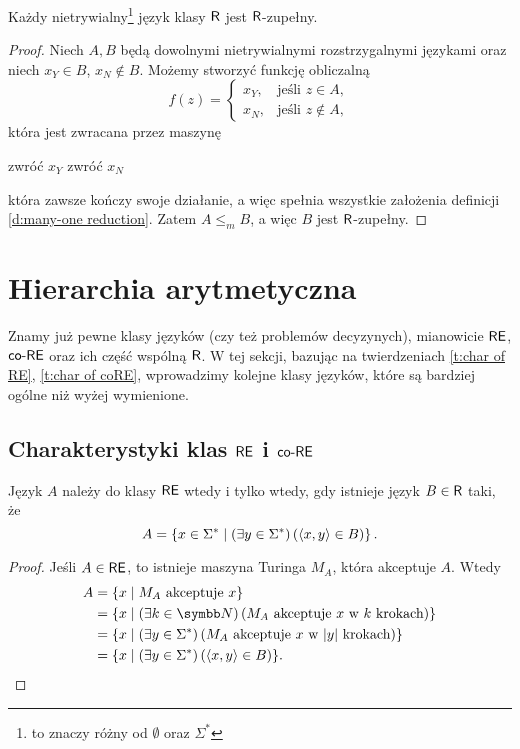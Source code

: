 \begin{theorem}\label{t:nontrivial R language is R-complete}
    Każdy nietrywialny\footnote{to znaczy różny od $\emptyset$ oraz $\Sigma^*$} język klasy $\textsf{R}$ jest $\textsf{R}$-zupełny.
\end{theorem}
\begin{proof}
    Niech $A, B$ będą dowolnymi nietrywialnymi rozstrzygalnymi językami oraz niech $x_Y \in B$, $x_N \notin B$. Możemy stworzyć funkcję obliczalną
    \[ f(z) =
        \begin{cases}
            x_Y, & \text{jeśli } z \in A, \\
            x_N, & \text{jeśli } z \notin A,
        \end{cases}
    \]
    która jest zwracana przez maszynę
    \begin{algorithmic}
            \State zwróć $x_Y$
        \Else
            \State zwróć $x_N$
        \EndIf
    \end{algorithmic}
    która zawsze kończy swoje działanie, a więc spełnia wszystkie założenia definicji \ref{d:many-one reduction}. Zatem $A \leq_m B$, a więc $B$ jest $\textsf{R}$-zupełny.
\end{proof}

\section{Hierarchia arytmetyczna}
Znamy już pewne klasy języków (czy też problemów decyzynych), mianowicie $\textsf{RE}$, $\textsf{co-RE}$ oraz ich część wspólną $\textsf{R}$. W tej sekcji, bazując na twierdzeniach \ref{t:char of RE}, \ref{t:char of coRE}, wprowadzimy kolejne klasy języków, które są bardziej ogólne niż wyżej wymienione.

\subsection{Charakterystyki klas $\textsf{RE}$ i $\textsf{co-RE}$}

\begin{theorem}\label{t:char of RE}
    Język $A$ należy do klasy $\textsf{RE}$ wtedy i tylko wtedy, gdy istnieje język $B \in \textsf{R}$ taki, że
    \[ A = \left\{x \in \Sigma^* \mid \left(\exists y \in \Sigma^* \right) \left(\left\langle x, y \right\rangle \in B\right) \right\}. \]
\end{theorem}
\begin{proof}
    Jeśli $A \in \textsf{RE}$, to istnieje maszyna Turinga $M_A$, która akceptuje $A$. Wtedy
    \begin{align*}
        A &= \{x \mid M_A \text{ akceptuje } x\} \\
        &= \{x \mid \left(\exists k \in \NN\right) \left(M_A \text{ akceptuje } x \text{ w } k \text{ krokach}\right)\} \\
        &= \{x \mid \left(\exists y \in \Sigma^*\right) \left(M_A \text{ akceptuje } x \text{ w } |y| \text{ krokach}\right)\} \\
        &= \{x \mid \left(\exists y \in \Sigma^*\right) \left(\encode{x, y} \in B\right)\}.
    \end{align*}
\end{proof}

